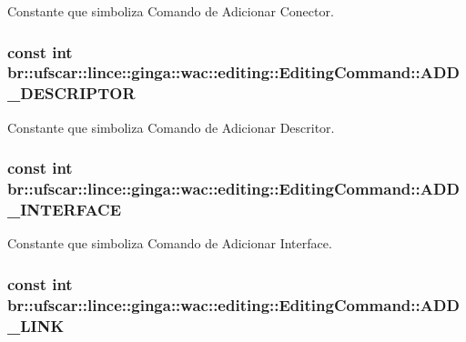 Constante que simboliza Comando de Adicionar Conector. 

\hypertarget{classbr_1_1ufscar_1_1lince_1_1ginga_1_1wac_1_1editing_1_1EditingCommand_aaea800af619e90359484819451c9d5dd}{
\subsubsection[{ADD\_\-DESCRIPTOR}]{\setlength{\rightskip}{0pt plus 5cm}const int {\bf br::ufscar::lince::ginga::wac::editing::EditingCommand::ADD\_\-DESCRIPTOR}}}
\label{classbr_1_1ufscar_1_1lince_1_1ginga_1_1wac_1_1editing_1_1EditingCommand_aaea800af619e90359484819451c9d5dd}


Constante que simboliza Comando de Adicionar Descritor. 

\hypertarget{classbr_1_1ufscar_1_1lince_1_1ginga_1_1wac_1_1editing_1_1EditingCommand_aa89778b585a254f911e3f767a5cd4923}{
\subsubsection[{ADD\_\-INTERFACE}]{\setlength{\rightskip}{0pt plus 5cm}const int {\bf br::ufscar::lince::ginga::wac::editing::EditingCommand::ADD\_\-INTERFACE}}}
\label{classbr_1_1ufscar_1_1lince_1_1ginga_1_1wac_1_1editing_1_1EditingCommand_aa89778b585a254f911e3f767a5cd4923}


Constante que simboliza Comando de Adicionar Interface. 

\hypertarget{classbr_1_1ufscar_1_1lince_1_1ginga_1_1wac_1_1editing_1_1EditingCommand_a0bc520ae2a61697821058d8a54ddd9fa}{
\subsubsection[{ADD\_\-LINK}]{\setlength{\rightskip}{0pt plus 5cm}const int {\bf br::ufscar::lince::ginga::wac::editing::EditingCommand::ADD\_\-LINK}}}
\label{classbr_1_1ufscar_1_1lince_1_1ginga_1_1wac_1_1editing_1_1EditingCommand_a0bc520ae2a61697821058d8a54ddd9fa}


